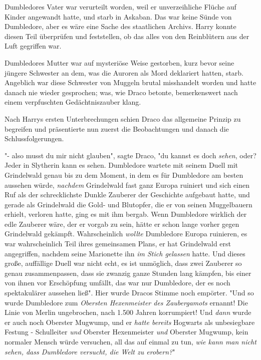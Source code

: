 {Dumbledores Vater war verurteilt worden, weil er unverzeihliche Flüche auf Kinder angewandt hatte, und starb in Askaban. Das war keine Sünde von Dumbledore, aber es wäre eine Sache des staatlichen Archivs. Harry konnte diesen Teil überprüfen und feststellen, ob das alles von den Reinblütern aus der Luft gegriffen war.

Dumbledores Mutter war auf mysteriöse Weise gestorben, kurz bevor seine jüngere Schwester an dem, was die Auroren als Mord deklariert hatten, starb. Angeblich war diese Schwester von Muggeln brutal misshandelt worden und hatte danach nie wieder gesprochen; was, wie Draco betonte, bemerkenswert nach einem verpfuschten Gedächtniszauber klang.

Nach Harrys ersten Unterbrechungen schien Draco das allgemeine Prinzip zu begreifen und präsentierte nun zuerst die Beobachtungen und danach die Schlussfolgerungen.

"- also musst du mir nicht glauben", sagte Draco, "du kannst es doch \emph{sehen}, oder? Jeder in Slytherin kann es sehen. Dumbledore wartete mit seinem Duell mit Grindelwald genau bis zu dem Moment, in dem es für Dumbledore am besten aussehen würde, \emph{nachdem} Grindelwald fast ganz Europa ruiniert und sich einen Ruf als der schrecklichste Dunkle Zauberer der Geschichte aufgebaut hatte, und gerade als Grindelwald die Gold- und Blutopfer, die er von seinen Muggelbauern erhielt, verloren hatte, ging es mit ihm bergab. Wenn Dumbledore wirklich der edle Zauberer wäre, der er vorgab zu sein, hätte er schon lange vorher gegen Grindelwald gekämpft. Wahrscheinlich \emph{wollte} Dumbledore Europa ruinieren, es war wahrscheinlich Teil ihres gemeinsamen Plans, er hat Grindelwald erst angegriffen, nachdem seine Marionette ihn \emph{im Stich gelassen} hatte. Und dieses große, auffällige Duell war nicht echt, es ist unmöglich, dass zwei Zauberer so genau zusammenpassen, dass sie zwanzig ganze Stunden lang kämpfen, bis einer von ihnen vor Erschöpfung umfällt, das war nur Dumbledore, der es noch spektakulärer aussehen ließ". Hier wurde Dracos Stimme noch empörter. "Und so wurde Dumbledore zum \emph{Obersten Hexenmeister des Zaubergamots} ernannt! Die Linie von Merlin ungebrochen, nach 1.500 Jahren korrumpiert! Und \emph{dann} wurde er auch noch Oberster Mugwump, und er \emph{hatte bereits} Hogwarts als unbesiegbare Festung - Schulleiter \emph{und} Oberster Hexenmeister \emph{und} Oberster Mugwump, kein normaler Mensch würde versuchen, all das auf einmal zu tun, \emph{wie kann man nicht sehen, dass Dumbledore versucht, die Welt zu erobern?}"

}
